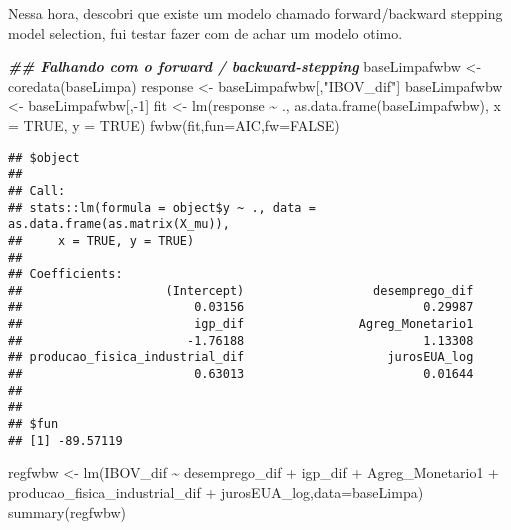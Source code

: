 \documentclass[
]{article}
\newenvironment{Shaded}{\begin{snugshade}}{\end{snugshade}}
\newcommand{\AttributeTok}[1]{\textcolor[rgb]{0.77,0.63,0.00}{#1}}
\newcommand{\ConstantTok}[1]{\textcolor[rgb]{0.00,0.00,0.00}{#1}}
\newcommand{\DecValTok}[1]{\textcolor[rgb]{0.00,0.00,0.81}{#1}}
\newcommand{\DocumentationTok}[1]{\textcolor[rgb]{0.56,0.35,0.01}{\textbf{\textit{#1}}}}
\newcommand{\FunctionTok}[1]{\textcolor[rgb]{0.00,0.00,0.00}{#1}}
\newcommand{\NormalTok}[1]{#1}
\newcommand{\OtherTok}[1]{\textcolor[rgb]{0.56,0.35,0.01}{#1}}
\newcommand{\SpecialCharTok}[1]{\textcolor[rgb]{0.00,0.00,0.00}{#1}}
\newcommand{\StringTok}[1]{\textcolor[rgb]{0.31,0.60,0.02}{#1}}
\begin{document}
Nessa hora, descobri que existe um modelo chamado forward/backward
stepping model selection, fui testar fazer com de achar um modelo otimo.

\begin{Shaded}
\begin{Highlighting}[]
\DocumentationTok{\#\# Falhando com o forward / backward{-}stepping}
\NormalTok{baseLimpafwbw }\OtherTok{\textless{}{-}} \FunctionTok{coredata}\NormalTok{(baseLimpa)}
\NormalTok{response }\OtherTok{\textless{}{-}}\NormalTok{ baseLimpafwbw[,}\StringTok{"IBOV\_dif"}\NormalTok{]}
\NormalTok{baseLimpafwbw }\OtherTok{\textless{}{-}}\NormalTok{ baseLimpafwbw[,}\SpecialCharTok{{-}}\DecValTok{1}\NormalTok{]}
\NormalTok{fit }\OtherTok{\textless{}{-}} \FunctionTok{lm}\NormalTok{(response }\SpecialCharTok{\textasciitilde{}}\NormalTok{ ., }\FunctionTok{as.data.frame}\NormalTok{(baseLimpafwbw), }\AttributeTok{x =} \ConstantTok{TRUE}\NormalTok{, }\AttributeTok{y =} \ConstantTok{TRUE}\NormalTok{)}
\FunctionTok{fwbw}\NormalTok{(fit,}\AttributeTok{fun=}\NormalTok{AIC,}\AttributeTok{fw=}\ConstantTok{FALSE}\NormalTok{)}
\end{Highlighting}
\end{Shaded}

\begin{verbatim}
## $object
## 
## Call:
## stats::lm(formula = object$y ~ ., data = as.data.frame(as.matrix(X_mu)), 
##     x = TRUE, y = TRUE)
## 
## Coefficients:
##                    (Intercept)                  desemprego_dif  
##                        0.03156                         0.29987  
##                        igp_dif                Agreg_Monetario1  
##                       -1.76188                         1.13308  
## producao_fisica_industrial_dif                    jurosEUA_log  
##                        0.63013                         0.01644  
## 
## 
## $fun
## [1] -89.57119
\end{verbatim}

\begin{Shaded}
\begin{Highlighting}[]
\NormalTok{regfwbw }\OtherTok{\textless{}{-}} \FunctionTok{lm}\NormalTok{(IBOV\_dif }\SpecialCharTok{\textasciitilde{}}\NormalTok{ desemprego\_dif }\SpecialCharTok{+}\NormalTok{ igp\_dif }\SpecialCharTok{+}\NormalTok{ Agreg\_Monetario1 }\SpecialCharTok{+}\NormalTok{ producao\_fisica\_industrial\_dif }\SpecialCharTok{+}\NormalTok{ jurosEUA\_log,}\AttributeTok{data=}\NormalTok{baseLimpa)}
\FunctionTok{summary}\NormalTok{(regfwbw)}
\end{Highlighting}
\end{Shaded}
\end{document}
